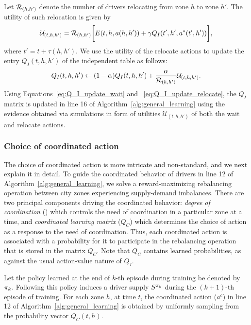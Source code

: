 Let ${{\mathcal{R}}}_{(h, h')}$ denote the number of drivers relocating from zone $h$
    to zone $h'$. The utility of such relocation is given by
    \begin{equation*}
        \mathcal{U}_{(t,h,h')} = {{\mathcal{R}}}_{(h, h')} \bigg[E(t, h,
            a(h, h')) + \gamma
        Q_I(t', h', a^*(t', h'))\bigg],
    \end{equation*}
    where $t' = t + \tau(h, h')$. 
We use the utility of the relocate actions to update the entry $Q_I(t, h, h')$
    of the independent table as follows: 
    \begin{equation}
    \label{eq:Q_I_update_relocate}
        Q_I(t, h, h') \leftarrow (1 - \alpha)Q_I(t, h, h') 
        + \frac{\alpha}{\relocatingdrivers_{(h, h')}}\mathcal{U}_{(t, h,h')}.
    \end{equation}
Using Equations~\eqref{eq:Q_I_update_wait} and ~\eqref{eq:Q_I_update_relocate}, the
    $Q_I$ matrix is updated in line 16 of Algorithm~\ref{alg:general_learning} 
    using the evidence obtained via simulations in form of 
    utilities $\mathcal{U}_{(t, h, h')}$ of both the wait and relocate actions.

\subsubsection{Choice of coordinated action}
The choice of coordinated action is more intricate and non-standard, and we 
    next explain it in detail.
To guide the coordinated behavior of drivers in line 12 of
    Algorithm~\ref{alg:general_learning}, we solve a reward-maximizing
    rebalancing operation between city zones experiencing supply-demand
    imbalances. 
There are two principal components driving the coordinated behavior: 
\emph{degree of coordination} ({\coordination}) which controls the need of 
    coordination in a particular zone at a time, and \emph{coordinated learning
    matrix} ($Q_C$) which determines the choice of action as a response to the 
    need of coordination.
Thus, each coordinated action is associated with a probability for it to participate in
    the rebalancing operation that is stored in the matrix $Q_C$. 
Note that $Q_C$ contains learned probabilities, as against the usual 
    action-value nature of $Q_I$. 

Let the policy learned at the end of $k$-th episode during training be denoted
    by ${{{\pi}}}_k$. 
Following this policy induces a driver supply $S^{{{\pi}}_k}$ during 
    the $(k+1)$-th episode of training. 
For each zone $h$, at time $t$, the coordinated action ($a^c$) in line 12 of 
    Algorithm~\ref{alg:general_learning} is obtained by uniformly sampling 
    from the probability vector $Q_C(t, h)$.


